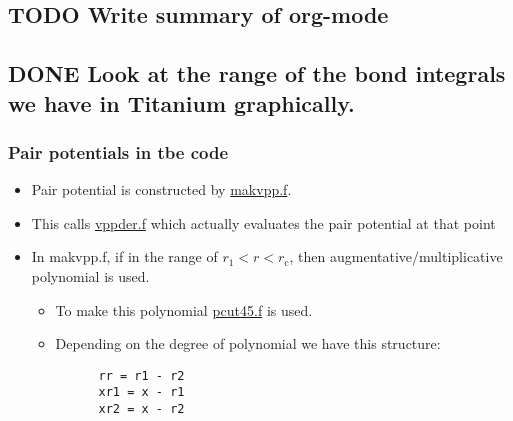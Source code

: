 \documentclass[11pt]{article}
\begin{document}
\subsection{{\bfseries\sffamily TODO} Write summary of org-mode}
\label{sec-1-5}
\subsection{{\bfseries\sffamily DONE} Look at the range of the bond integrals we have in Titanium graphically.}
\label{sec-1-6}
\subsubsection{Pair potentials in tbe code}
\label{sec-1-6-1}
\begin{itemize}
\item Pair potential is constructed by \href{file:///home/tigany/lm/tb/makvpp.f}{makvpp.f}.
\item This calls \href{file:///home/tigany/lm/tb/vppder.f}{vppder.f} which actually evaluates the pair potential at that
point
\item In makvpp.f, if in the range of $r_1 < r < r_{\text{c}}$, then
augmentative/multiplicative polynomial is used.
\begin{itemize}
\item To make this polynomial \href{file:///home/tigany/lm/tb/pcut45.f}{pcut45.f} is used.
\item Depending on the degree of polynomial we have this structure:
\begin{verbatim}
      rr = r1 - r2
      xr1 = x - r1
      xr2 = x - r2


\end{verbatim}
\end{itemize}
\end{itemize}
\end{document}

